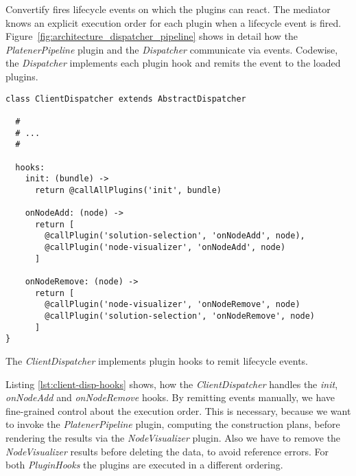 \documentclass[../ClassicThesis.tex]{subfiles}
\begin{document}
Convertify fires lifecycle events on which the plugins can react. The mediator
knows an explicit execution order for each plugin when a lifecycle event is
fired. Figure~\ref{fig:architecture_dispatcher_pipeline} shows in detail how the
\emph{PlatenerPipeline} plugin and the \emph{Dispatcher} communicate via events.
Codewise, the \emph{Dispatcher} implements each plugin hook and remits the event
to the loaded plugins.

\begin{listing}[!h]
\centering
\begin{verbatim}
class ClientDispatcher extends AbstractDispatcher

  #
  # ...
  #

  hooks:
    init: (bundle) ->
      return @callAllPlugins('init', bundle)

    onNodeAdd: (node) ->
      return [
        @callPlugin('solution-selection', 'onNodeAdd', node),
        @callPlugin('node-visualizer', 'onNodeAdd', node)
      ]

    onNodeRemove: (node) ->
      return [
        @callPlugin('node-visualizer', 'onNodeRemove', node)
        @callPlugin('solution-selection', 'onNodeRemove', node)
      ]
}
\end{verbatim}
\caption{The \emph{ClientDispatcher} implements plugin hooks to remit lifecycle events.}
\label{lst:client-disp-hooks}
\end{listing}

Listing \ref{lst:client-disp-hooks} shows, how the
\emph{ClientDispatcher} 
handles the \textit{init}, \textit{onNodeAdd} and
\textit{onNodeRemove} hooks. By remitting events manually, we have
fine-grained control about the execution order. This is necessary,
because we want to invoke the \emph{PlatenerPipeline} plugin,
computing the construction plans, before rendering the results via
the \emph{NodeVisualizer} plugin. Also we have to remove the
\emph{NodeVisualizer} results before deleting the data, to avoid
reference errors. For both \emph{PluginHooks} the plugins are
executed in a different ordering.

\end{document}
